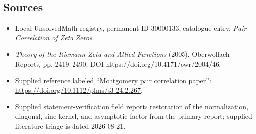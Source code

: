 \documentclass[11pt]{article}
\begin{document}
\subsection{Sources}
\begin{itemize}
\item Local UnsolvedMath registry, permanent ID 30000133, catalogue entry, \emph{Pair Correlation of Zeta Zeros}.
\item \emph{Theory of the Riemann Zeta and Allied Functions} (2005), Oberwolfach Reports, pp. 2419--2490, DOI \url{https://doi.org/10.4171/owr/2004/46}.
\item Supplied reference labeled ``Montgomery pair correlation paper'': \url{https://doi.org/10.1112/plms/s3-24.2.267}.
\item Supplied statement-verification field reports restoration of the normalization, diagonal, sine kernel, and asymptotic factor from the primary report; supplied literature triage is dated 2026-08-21.
\end{itemize}
\end{document}
